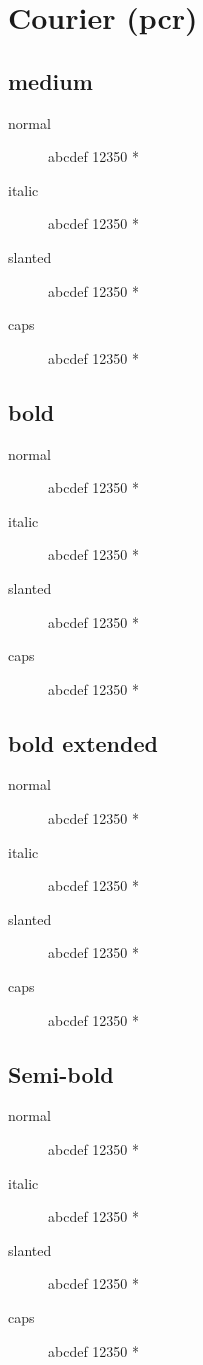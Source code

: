 \section{Courier (pcr)}

\subsection{medium}
\begin{description}
    \item [normal]  abcdef 12350 *
    \item [italic]  abcdef 12350 *
    \item [slanted]  abcdef 12350 *
    \item [caps]  abcdef 12350 *
\end{description}
    
\subsection{bold}
\begin{description}
    \item [normal]  abcdef 12350 *
    \item [italic]  abcdef 12350 *
    \item [slanted]  abcdef 12350 *
    \item [caps]  abcdef 12350 *
\end{description}
    
\subsection{bold extended}
\begin{description}
    \item [normal]  abcdef 12350 *
    \item [italic]  abcdef 12350 *
    \item [slanted]  abcdef 12350 *
    \item [caps]  abcdef 12350 *
\end{description}

\subsection{Semi-bold}
\begin{description}
    \item [normal]  abcdef 12350 *
    \item [italic]  abcdef 12350 *
    \item [slanted]  abcdef 12350 *
    \item [caps]  abcdef 12350 *
\end{description}

